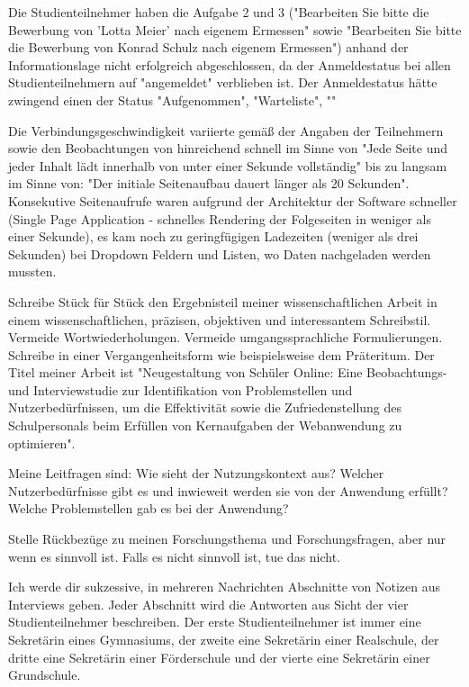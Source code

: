 Die Studienteilnehmer haben die Aufgabe 2 und 3 ("Bearbeiten Sie bitte die Bewerbung von 'Lotta Meier' nach eigenem Ermessen" sowie "Bearbeiten Sie bitte die Bewerbung von Konrad Schulz nach eigenem Ermessen") anhand der Informationslage nicht erfolgreich abgeschlossen, da der Anmeldestatus bei allen Studienteilnehmern auf "angemeldet" verblieben ist. Der Anmeldestatus hätte zwingend einen der Status "Aufgenommen", "Warteliste", ""

Die Verbindungsgeschwindigkeit variierte gemäß der Angaben der Teilnehmern sowie den Beobachtungen von hinreichend schnell im Sinne von "Jede Seite und jeder Inhalt lädt innerhalb von unter einer Sekunde vollständig" bis zu langsam im Sinne von: "Der initiale Seitenaufbau dauert länger als 20 Sekunden". Konsekutive Seitenaufrufe waren aufgrund der Architektur der Software schneller (Single Page Application - schnelles Rendering der Folgeseiten in weniger als einer Sekunde), es kam noch zu geringfügigen Ladezeiten (weniger als drei Sekunden) bei Dropdown Feldern und Listen, wo Daten nachgeladen werden mussten.




Schreibe Stück für Stück den Ergebnisteil meiner wissenschaftlichen Arbeit in einem wissenschaftlichen, präzisen, objektiven und interessantem Schreibstil. Vermeide Wortwiederholungen. Vermeide umgangssprachliche Formulierungen. Schreibe in einer Vergangenheitsform wie beispielsweise dem Präteritum. 
Der Titel meiner Arbeit ist "Neugestaltung von Schüler Online: Eine Beobachtungs- und Interviewstudie zur Identifikation von Problemstellen und Nutzerbedürfnissen, um die Effektivität sowie die Zufriedenstellung des Schulpersonals beim Erfüllen von Kernaufgaben der Webanwendung zu optimieren". 

Meine Leitfragen sind:
Wie sieht der Nutzungskontext aus? 
Welcher Nutzerbedürfnisse gibt es und inwieweit werden sie von der Anwendung erfüllt? 
Welche Problemstellen gab es bei der Anwendung?  

Stelle Rückbezüge zu meinen Forschungsthema und Forschungsfragen, aber nur wenn es sinnvoll ist. Falls es nicht sinnvoll ist, tue das nicht.

Ich werde dir sukzessive, in mehreren Nachrichten Abschnitte von Notizen aus Interviews geben. Jeder Abschnitt wird die Antworten aus Sicht der vier Studienteilnehmer beschreiben. Der erste Studienteilnehmer ist immer eine Sekretärin eines Gymnasiums, der zweite eine Sekretärin einer Realschule, der dritte eine Sekretärin einer Förderschule und der vierte eine Sekretärin einer Grundschule.

